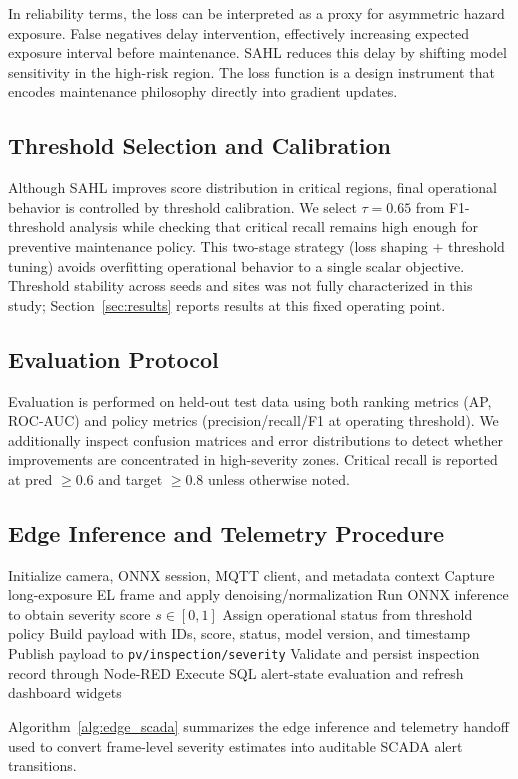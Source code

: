 \documentclass[journal]{IEEEtran}
\begin{document}
In reliability terms, the loss can be interpreted as a proxy for asymmetric hazard exposure. False negatives delay intervention, effectively increasing expected exposure interval before maintenance. SAHL reduces this delay by shifting model sensitivity in the high-risk region. The loss function is a design instrument that encodes maintenance philosophy directly into gradient updates.

\subsection{Threshold Selection and Calibration}
Although SAHL improves score distribution in critical regions, final operational behavior is controlled by threshold calibration. We select $\tau=0.65$ from F1-threshold analysis while checking that critical recall remains high enough for preventive maintenance policy. This two-stage strategy (loss shaping + threshold tuning) avoids overfitting operational behavior to a single scalar objective. Threshold stability across seeds and sites was not fully characterized in this study; Section~\ref{sec:results} reports results at this fixed operating point.

\subsection{Evaluation Protocol}
Evaluation is performed on held-out test data using both ranking metrics (AP, ROC-AUC) and policy metrics (precision/recall/F1 at operating threshold). We additionally inspect confusion matrices and error distributions to detect whether improvements are concentrated in high-severity zones. Critical recall is reported at pred $\ge 0.6$ and target $\ge 0.8$ unless otherwise noted.

\subsection{Edge Inference and Telemetry Procedure}
\begin{algorithm}[!t]
\caption{Edge-to-SCADA Telemetry Loop}
\label{alg:edge_scada}
\scriptsize
\begin{algorithmic}[1]
\STATE Initialize camera, ONNX session, MQTT client, and metadata context
\LOOP
\STATE Capture long-exposure EL frame and apply denoising/normalization
\STATE Run ONNX inference to obtain severity score $s\in[0,1]$
\STATE Assign operational status from threshold policy
\STATE Build payload with IDs, score, status, model version, and timestamp
\STATE Publish payload to \texttt{pv/inspection/severity}
\STATE Validate and persist inspection record through Node-RED
\STATE Execute SQL alert-state evaluation and refresh dashboard widgets
\ENDLOOP
\end{algorithmic}
\end{algorithm}
Algorithm~\ref{alg:edge_scada} summarizes the edge inference and telemetry handoff used to convert frame-level severity estimates into auditable SCADA alert transitions.
\end{document}
